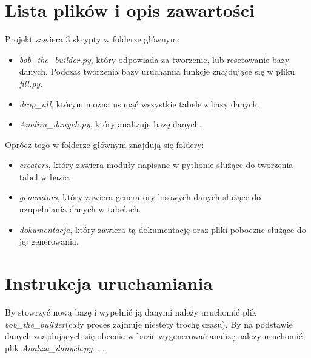 \documentclass[12pt,a4paper]{article}
\begin{document}
\section{Lista plików i opis zawartości}
Projekt zawiera 3 skrypty w folderze głównym:
\begin{itemize}
\item \textit{bob\_the\_builder.py}, który odpowiada za tworzenie, lub resetowanie bazy danych. Podczas tworzenia bazy uruchamia funkcje znajdujące się w pliku \textit{fill.py}.
\item \textit{drop\_all}, którym można usunąć wszystkie tabele z bazy danych.
\item \textit{Analiza\_danych.py}, który analizuję bazę danych.
\end{itemize}
Oprócz tego w folderze głównym znajdują się foldery:
\begin{itemize}
\item \textit{creators}, który zawiera moduły napisane w pythonie służące do tworzenia tabel w bazie.
\item \textit{generators}, który zawiera generatory losowych danych służące do uzupełniania danych w tabelach.
\item \textit{dokumentacja}, który zawiera tą dokumentację oraz pliki poboczne służące do jej generowania.
\end{itemize}
\section{Instrukcja uruchamiania}
By stowrzyć nową bazę i wypełnić ją danymi należy uruchomić plik \textit{bob\_the\_builder}(cały proces zajmuje niestety trochę czasu). By na podstawie danych znajdujących się obecnie w bazie wygenerować analizę należy uruchomić plik \textit{Analiza\_danych.py}. ...
\end{document}
